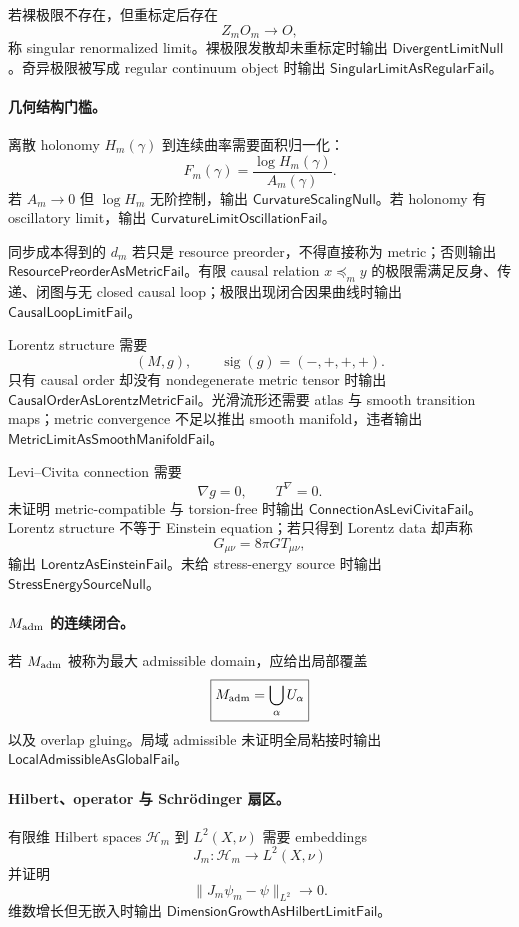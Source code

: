 若裸极限不存在，但重标定后存在
\[
Z_mO_m\to O,
\]
称 singular renormalized limit。裸极限发散却未重标定时输出 \(\mathsf{DivergentLimitNull}\)。奇异极限被写成 regular continuum object 时输出 \(\mathsf{SingularLimitAsRegularFail}\)。

\paragraph{几何结构门槛。}
离散 holonomy \(H_m(\gamma)\) 到连续曲率需要面积归一化：
\[
\boxed{
F_m(\gamma)=\frac{\log H_m(\gamma)}{A_m(\gamma)}.
}
\]
若 \(A_m\to0\) 但 \(\log H_m\) 无阶控制，输出 \(\mathsf{CurvatureScalingNull}\)。若 holonomy 有 oscillatory limit，输出 \(\mathsf{CurvatureLimitOscillationFail}\)。

同步成本得到的 \(d_m\) 若只是 resource preorder，不得直接称为 metric；否则输出 \(\mathsf{ResourcePreorderAsMetricFail}\)。有限 causal relation \(x\preceq_m y\) 的极限需满足反身、传递、闭图与无 closed causal loop；极限出现闭合因果曲线时输出 \(\mathsf{CausalLoopLimitFail}\)。

Lorentz structure 需要
\[
(M,g),\qquad \operatorname{sig}(g)=(-,+,+,+).
\]
只有 causal order 却没有 nondegenerate metric tensor 时输出 \(\mathsf{CausalOrderAsLorentzMetricFail}\)。光滑流形还需要 atlas 与 smooth transition maps；metric convergence 不足以推出 smooth manifold，违者输出 \(\mathsf{MetricLimitAsSmoothManifoldFail}\)。

Levi--Civita connection 需要
\[
\nabla g=0,\qquad T^\nabla=0.
\]
未证明 metric-compatible 与 torsion-free 时输出 \(\mathsf{ConnectionAsLeviCivitaFail}\)。Lorentz structure 不等于 Einstein equation；若只得到 Lorentz data 却声称
\[
G_{\mu\nu}=8\pi GT_{\mu\nu},
\]
输出 \(\mathsf{LorentzAsEinsteinFail}\)。未给 stress-energy source 时输出 \(\mathsf{StressEnergySourceNull}\)。

\paragraph{\(M_{\rm adm}\) 的连续闭合。}
若 \(M_{\rm adm}\) 被称为最大 admissible domain，应给出局部覆盖
\[
\boxed{
M_{\rm adm}=\bigcup_\alpha U_\alpha
}
\]
以及 overlap gluing。局域 admissible 未证明全局粘接时输出 \(\mathsf{LocalAdmissibleAsGlobalFail}\)。

\paragraph{Hilbert、operator 与 Schrödinger 扇区。}
有限维 Hilbert spaces \(\mathcal H_m\) 到 \(L^2(X,\nu)\) 需要 embeddings
\[
J_m:\mathcal H_m\to L^2(X,\nu)
\]
并证明
\[
\|J_m\psi_m-\psi\|_{L^2}\to0.
\]
维数增长但无嵌入时输出 \(\mathsf{DimensionGrowthAsHilbertLimitFail}\)。

